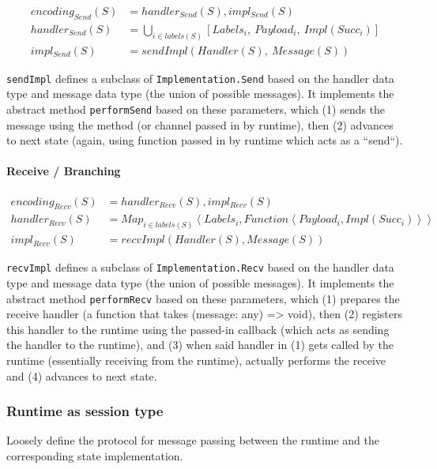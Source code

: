 \documentclass{article}
\begin{document}
\begin{align}
encoding_{Send}(S) &= handler_{Send}(S), impl_{Send}(S) \\
handler_{Send}(S) &= \bigcup_{i \in labels(S)} [Labels_i,~Payload_i,~Impl(Succ_i)] \\
impl_{Send}(S) &= sendImpl(Handler(S),~Message(S))
\end{align}

\texttt{sendImpl} defines a subclass of \texttt{Implementation.Send} based on the handler data type
and message data type (the union of possible messages). It implements the abstract method
\texttt{performSend} based on these parameters, which (1) sends the message using
the method (or channel passed in by runtime), then (2) advances to next state (again, using
function passed in by runtime which acts as a ``send``).

\paragraph{Receive / Branching}

\begin{align}
encoding_{Recv}(S) &= handler_{Recv}(S), impl_{Recv}(S) \\
handler_{Recv}(S) &= Map_{i \in labels(S)}\left<Labels_i, Function\left<Payload_i, Impl(Succ_i)\right>\right> \\
impl_{Recv}(S) &= recvImpl(Handler(S), Message(S))
\end{align}

\texttt{recvImpl} defines a subclass of \texttt{Implementation.Recv} based on the handler data type
and message data type (the union of possible messages). It implements the abstract method
\texttt{performRecv} based on these parameters, which (1) prepares the receive handler (a function that takes
(message: any) => void), then (2) registers this handler to the runtime using the passed-in callback
(which acts as sending the handler to the runtime), and (3) when said handler in (1) gets called by the runtime
(essentially receiving from the runtime), actually performs the receive and (4) advances to next state.

\subsubsection{Runtime as session type}
Loosely define the protocol for message passing between the runtime and the
corresponding state implementation.
\end{document}
